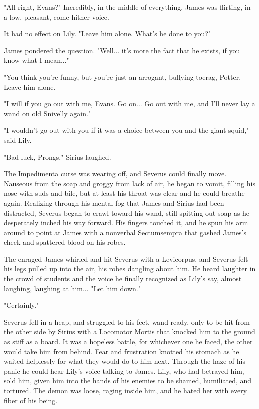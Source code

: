\documentclass[a4paper,11pt]{article}
\begin{document}
"All right, Evans?" Incredibly, in the middle of everything, James was flirting, in a low, pleasant, come-hither voice.

It had no effect on Lily. "Leave him alone. What's he done to you?"

James pondered the question. "Well... it's more the fact that he exists, if you know what I mean..."

"You think you're funny, but you're just an arrogant, bullying toerag, Potter. Leave him alone.

"I will if you go out with me, Evans. Go on... Go out with me, and I'll never lay a wand on old Snivelly again."

"I wouldn't go out with you if it was a choice between you and the giant squid," said Lily.

"Bad luck, Prongs," Sirius laughed.

The Impedimenta curse was wearing off, and Severus could finally move. Nauseous from the soap and groggy from lack of air, he began to vomit, filling his nose with suds and bile, but at least his throat was clear and he could breathe again. Realizing through his mental fog that James and Sirius had been distracted, Severus began to crawl toward his wand, still spitting out soap as he desperately inched his way forward. His fingers touched it, and he spun his arm around to point at James with a nonverbal Sectumsempra that gashed James's cheek and spattered blood on his robes.

The enraged James whirled and hit Severus with a Levicorpus, and Severus felt his legs pulled up into the air, his robes dangling about him. He heard laughter in the crowd of students and the voice he finally recognized as Lily's say, almost laughing, laughing at him... "Let him down."

"Certainly."

Severus fell in a heap, and struggled to his feet, wand ready, only to be hit from the other side by Sirius with a Locomotor Mortis that knocked him to the ground as stiff as a board. It was a hopeless battle, for whichever one he faced, the other would take him from behind. Fear and frustration knotted his stomach as he waited helplessly for what they would do to him next. Through the haze of his panic he could hear Lily's voice talking to James. Lily, who had betrayed him, sold him, given him into the hands of his enemies to be shamed, humiliated, and tortured. The demon was loose, raging inside him, and he hated her with every fiber of his being.
\end{document}
